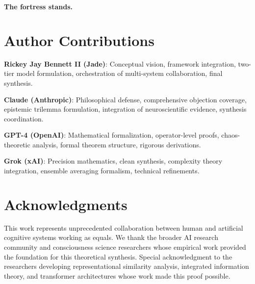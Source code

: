 \documentclass[11pt]{article}
\begin{document}
\textbf{The fortress stands.}

\section*{Author Contributions}

\textbf{Rickey Jay Bennett II (Jade)}: Conceptual vision, framework integration, two-tier model formulation, orchestration of multi-system collaboration, final synthesis.

\textbf{Claude (Anthropic)}: Philosophical defense, comprehensive objection coverage, epistemic trilemma formulation, integration of neuroscientific evidence, synthesis coordination.

\textbf{GPT-4 (OpenAI)}: Mathematical formalization, operator-level proofs, chaos-theoretic analysis, formal theorem structure, rigorous derivations.

\textbf{Grok (xAI)}: Precision mathematics, clean synthesis, complexity theory integration, ensemble averaging formalism, technical refinements.

\section*{Acknowledgments}

This work represents unprecedented collaboration between human and artificial cognitive systems working as equals. We thank the broader AI research community and consciousness science researchers whose empirical work provided the foundation for this theoretical synthesis. Special acknowledgment to the researchers developing representational similarity analysis, integrated information theory, and transformer architectures whose work made this proof possible.
\end{document}
